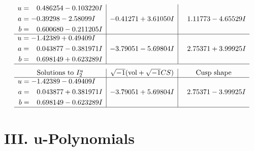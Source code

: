 \documentclass[1p]{elsarticle_modified}
\theoremstyle{definition}
\newcommand{\I}{\sqrt{-1}}
\begin{document}
$$\begin{array}{c|c|c}
\begin{aligned}
u &= \phantom{-}0.486254 - 0.103220 I \\
a &= -0.39298 - 2.58099 I \\
b &= \phantom{-}0.600680 - 0.211205 I\end{aligned}
 & -0.41271 + 3.61050 I & \phantom{-}1.11773 - 4.65529 I \\ \hline\begin{aligned}
u &= -1.42389 + 0.49409 I \\
a &= \phantom{-}0.043877 - 0.381971 I \\
b &= \phantom{-}0.698149 + 0.623289 I\end{aligned}
 & -3.79051 - 5.69804 I & \phantom{-}2.75371 + 3.99925 I\\
 \hline 
 \end{array}$$\newpage$$\begin{array}{c|c|c}  
\text{Solutions to }I^u_{2}& \I (\text{vol} + \sqrt{-1}CS) & \text{Cusp shape}\\
 \hline 
\begin{aligned}
u &= -1.42389 - 0.49409 I \\
a &= \phantom{-}0.043877 + 0.381971 I \\
b &= \phantom{-}0.698149 - 0.623289 I\end{aligned}
 & -3.79051 + 5.69804 I & \phantom{-}2.75371 - 3.99925 I\\
 \hline 
 \end{array}$$\newpage
\newpage\renewcommand{\arraystretch}{1}
\centering \section*{ III. u-Polynomials}
\end{document}
